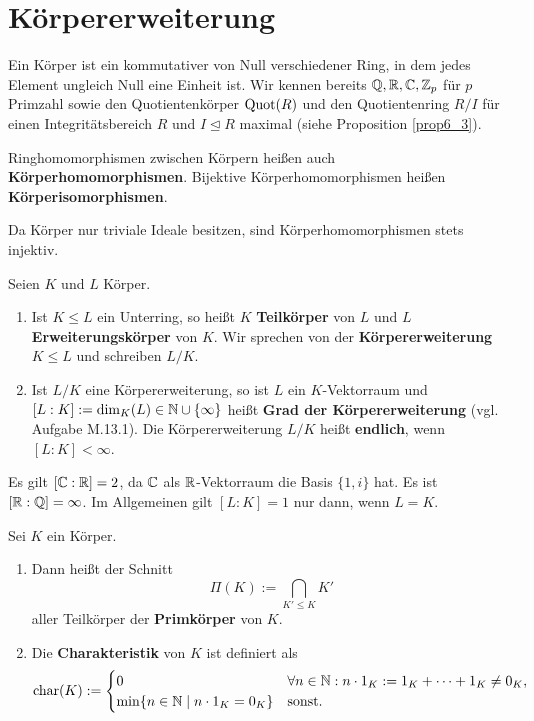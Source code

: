 \section{Körpererweiterung}
Ein Körper ist ein kommutativer von Null verschiedener Ring, in dem jedes Element ungleich Null eine Einheit ist. Wir kennen bereits $\mathbb{Q}, \mathbb{R}, \mathbb{C}, \mathbb{Z}_p$ für $p$ Primzahl sowie den Quotientenkörper $\mathrm{Quot}(R)$ und den Quotientenring $R/I$ für einen Integritätsbereich $R$ und $I \unlhd R$ maximal (siehe Proposition \ref{prop6_3}).

Ringhomomorphismen zwischen Körpern heißen auch \textbf{Körperhomomorphismen}. Bijektive Körperhomomorphismen heißen \textbf{Körperisomorphismen}.

Da Körper nur triviale Ideale besitzen, sind Körperhomomorphismen stets injektiv.
\begin{definition}
	Seien $K$ und $L$ Körper. 
	\begin{enumerate}[label=(\alph*)]
		\item Ist $K \leq L$ ein Unterring, so heißt $K$ \textbf{Teilkörper} von $L$ und $L$ \textbf{Erweiterungskörper} von $K$. Wir sprechen von der \textbf{Körpererweiterung} $K \leq L$ und schreiben $L / K$.
		\item Ist $L/K$ eine Körpererweiterung, so ist $L$ ein $K$-Vektorraum und $[L:K] := \dim_K(L) \in \mathbb{N} \cup \{\infty\}$ heißt \textbf{Grad der Körpererweiterung} (vgl. Aufgabe M.13.1).  Die Körpererweiterung $L/K$ heißt \textbf{endlich}, wenn $[L:K] < \infty$.
	\end{enumerate}
\end{definition}
\begin{beispiel}\label{beispiel7_2}
	Es gilt $[\mathbb{C} : \mathbb{R}] = 2$, da $\mathbb{C}$ als $\mathbb{R}$-Vektorraum die Basis $\{1,i\}$ hat. Es ist $[\mathbb{R} : \mathbb{Q}] = \infty$. Im Allgemeinen gilt $[L : K] = 1$ nur dann, wenn $L = K$. 
\end{beispiel}
\begin{definition}
	Sei $K$ ein Körper. 
	\begin{enumerate}[label=(\alph*)]
		\item Dann heißt der Schnitt
		\[\Pi(K) := \bigcap_{K' \leq K} K'\]
		aller Teilkörper der \textbf{Primkörper} von $K$.
		\item Die \textbf{Charakteristik} von $K$ ist definiert als
		\[\mathrm{char}(K) := \begin{cases}
			0 & \forall n \in \mathbb{N} : n \cdot 1_K := 1_K + \dots + 1_K \neq 0_K,\\
			\min\{n \in \mathbb{N} \mid n \cdot 1_K = 0_K\} & \text{sonst.}
		\end{cases}\]
	\end{enumerate}
\end{definition}
